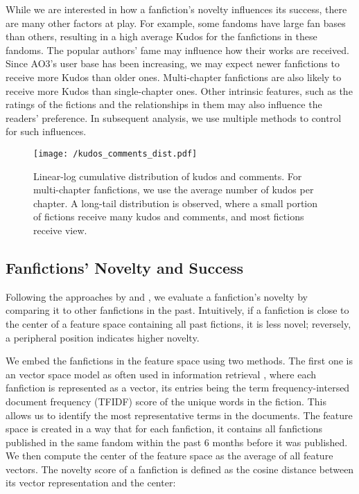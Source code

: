 \documentclass[a4paper]{article}
\begin{document}
While we are interested in how a fanfiction's novelty influences its success, there are many other factors at play. For example, some fandoms have large fan bases than others, resulting in a high average Kudos for the fanfictions in these fandoms. The popular authors' fame may influence how their works are received. Since AO3's user base has been increasing, we may expect newer fanfictions to receive more Kudos than older ones. Multi-chapter fanfictions are also likely to receive more Kudos than single-chapter ones. Other intrinsic features, such as the ratings of the fictions and the relationships in them may also influence the readers' preference. In subsequent analysis, we use multiple methods to control for such influences.

\begin{figure}
    \centering
        \texttt{[image: /kudos\_comments\_dist.pdf]}
        \caption{Linear-log cumulative distribution of kudos and comments. For multi-chapter fanfictions, we use the average number of kudos per chapter. A long-tail distribution is observed, where a small portion of fictions receive many kudos and comments, and most fictions receive view.}
        \label{fig:kudos_dist}
\end{figure}


\subsection*{Fanfictions' Novelty and Success}
Following the approaches by \cite{askin2017makes} and \cite{de2015game}, we evaluate a fanfiction's novelty by comparing it to other fanfictions in the past. Intuitively, if a fanfiction is close to the center of a feature space containing all past fictions, it is less novel; reversely, a peripheral position indicates higher novelty. 

We embed the fanfictions in the feature space using two methods. The first one is an vector space model as often used in information retrieval \cite{turney2010frequency}, where each fanfiction is represented as a vector, its entries being the term frequency-intersed document frequency (TFIDF) score of the unique words in the fiction. This allows us to identify the most representative terms in the documents. The feature space is created in a way that for each fanfiction, it contains all fanfictions published in the same fandom within the past 6 months before it was published. We then compute the center of the feature space as the average of all feature vectors. The novelty score of a fanfiction is defined as the cosine distance between its vector representation and the center:
\end{document}
